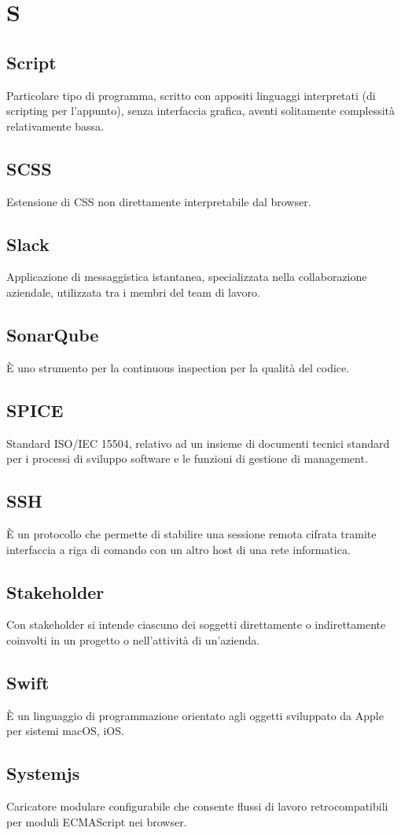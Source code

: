 \section*{S}

\subsection{Script}
Particolare tipo di programma, scritto con appositi linguaggi interpretati (di scripting per l'appunto), senza interfaccia grafica, aventi solitamente complessità relativamente bassa.

\subsection{SCSS}
Estensione di CSS non direttamente interpretabile dal browser.

\subsection{Slack}
Applicazione di messaggistica istantanea, specializzata nella collaborazione aziendale, utilizzata tra i membri del team di lavoro.

\subsection{SonarQube} 
È uno strumento per la continuous inspection per la qualità del codice.

\subsection{SPICE}
Standard ISO/IEC 15504, relativo ad un insieme di documenti tecnici standard per i processi di sviluppo software e le funzioni di gestione di management.

\subsection{SSH}
È un protocollo che permette di stabilire una sessione remota cifrata tramite interfaccia a riga di comando con un altro host di una rete informatica.

\subsection{Stakeholder}
Con stakeholder si intende ciascuno dei soggetti direttamente o indirettamente coinvolti in un progetto o nell'attività di un'azienda.

\subsection{Swift}
È un linguaggio di programmazione orientato agli oggetti sviluppato da Apple per sistemi macOS, iOS.

\subsection{Systemjs}
Caricatore modulare configurabile che consente flussi di lavoro retrocompatibili per moduli ECMAScript nei browser.